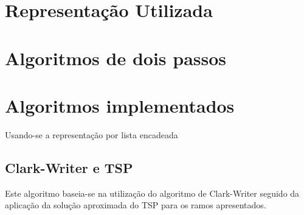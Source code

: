 \documentclass[a4paper,12pt]{book}
\begin{document}
\chapter{Representação Utilizada}

\chapter{Algoritmos de dois passos}


\chapter{Algoritmos implementados}

	Usando-se a representação por lista encadeada

\section{Clark-Writer e TSP}

	Este algoritmo baseia-se na utilização do algoritmo de Clark-Writer seguido da aplicação da
solução aproximada do TSP para os ramos apresentados.


	
\end{document}
